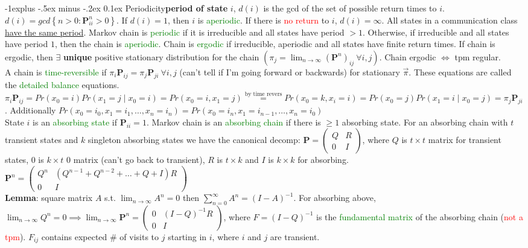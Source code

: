 \documentclass[landscape]{article}
\makeatletter
\renewcommand{\subsection}{\@startsection{subsection}{2}{0mm}%
                                {-1explus -.5ex minus -.2ex}%
                                {0.1ex}%
                                {\color{orange}\normalfont\normalsize\bfseries}}
\makeatother
\begin{document}
\begin{multicols*}{3}
\subsection{Periodicity}\textbf{period of state} $i$, $d(i)$
is the gcd of the set of possible return times to $i$.
$d(i) = gcd \left\{n > 0 : \mathbf{P}_{ii}^n > 0\right\}$. If
$d(i) = 1$, then $i$ is \textcolor{green}{aperiodic}. If there is
\textcolor{red}{no return} to $i$, $d(i) = \infty$. All states in a
communication class \underline{have the same period}. Markov chain is
\textcolor{green}{periodic} if it is irreducible and all states have
period $> 1$. Otherwise, if irreducible and all states have period
$1$, then the chain is \textcolor{green}{aperiodic}. Chain is
\textcolor{green}{ergodic} if irreducible, aperiodic and all states
have finite return times. If chain is ergodic, then $\exists$
\textbf{unique} positive stationary distribution for the chain
$(\pi_j = \lim_{n \to \infty}(\mathbf{P}^n)_{ij} \ \forall i,
j)$. Chain ergodic $\iff$ tpm regular.  \\ A chain is
\textcolor{green}{time-reversible} if
$\pi_i \mathbf{P}_{ij} = \pi_j \mathbf{P}_{ji} \ \forall i,j$ (can't
tell if I'm going forward or backwards) for stationary
$\vec{\pi}$. These equations are called the \textcolor{green}{detailed
  balance} equations.
$\pi_i \mathbf{P}_{ij} = Pr(x_0 = i)Pr(x_1 = j \mid x_0 = i) = Pr(x_0
= i, x_1 = j) \stackrel{\text{by time revers}}{=} Pr(x_0 = k, x_i = i)
= Pr(x_0 = j)Pr(x_1 = i \mid x_0 = j) = \pi_j
\mathbf{P}_{ji}$. Additionally
$Pr(x_0 = i_0, x_1 = i_1, \ldots, x_n = i_n) = Pr(x_0 = i_n, x_1 =
i_{n-1}, \ldots, x_n = i_0)$ \\ State $i$ is an
\textcolor{green}{absorbing state} if $\mathbf{P}_{ii} = 1$. Markov
chain is an \textcolor{green}{absorbing chain} if there is $\geq 1$
absorbing state. For an absorbing chain with $t$ transient states and
$k$ singleton absorbing states we have the canonical decomp:
$\mathbf{P} =
\begin{pmatrix}
  Q & R \\ 0 & I
\end{pmatrix}
$, where $Q$ is $t \times t$ matrix for transient states, $0$ is
$k \times t$ 0 matrix (can't go back to transient), $R$ is
$t \times k$ and $I$ is $k \times k$ for absorbing. $\mathbf{P}^n =
\begin{pmatrix}
  Q^n & (Q^{n-1} + Q^{n-2} + \ldots + Q + I) R \\ 0 & I
\end{pmatrix}
$ \\ \textbf{Lemma}: square matrix $A$ s.t.
$\lim_{n \to \infty} A^n = 0$ then
$\sum_{n=0}^{\infty}A^n = (I - A)^{-1}$. For absorbing above,
$\lim_{n\to \infty}Q^n = 0 \implies \lim_{n \to \infty} \mathbf{P}^n =
\begin{pmatrix}
  0 & (I-Q)^{-1}R \\ 0 & I
\end{pmatrix}
$, where $F = (I-Q)^{-1}$ is the \textcolor{green}{fundamental matrix}
of the absorbing chain (\textcolor{red}{not a tpm}). $F_{ij}$ contains
expected \# of visits to $j$ starting in $i$, where $i$ and $j$ are
transient.

\end{multicols*}
\end{document}
